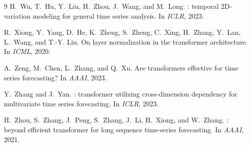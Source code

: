 \documentclass[11pt]{article}
\begin{document}
\begin{thebibliography}{9}
H.~Wu, T.~Hu, Y.~Liu, H.~Zhou, J.~Wang, and M.~Long.
: temporal 2{D}-variation modeling for general time
  series analysis.
\newblock In \emph{ICLR}, 2023.

R.~Xiong, Y.~Yang, D.~He, K.~Zheng, S.~Zheng, C.~Xing, H.~Zhang,
  Y.~Lan, L.~Wang, and T.-Y. Liu.
\newblock On layer normalization in the transformer architecture.
\newblock In \emph{ICML}, 2020.

A.~Zeng, M.~Chen, L.~Zhang, and Q.~Xu.
\newblock Are transformers effective for time series forecasting?
\newblock In \emph{AAAI}, 2023.

Y.~Zhang and J.~Yan.
: transformer utilizing cross-dimension dependency
  for multivariate time series forecasting.
\newblock In \emph{ICLR}, 2023.

H.~Zhou, S.~Zhang, J.~Peng, S.~Zhang, J.~Li, H.~Xiong, and W.~Zhang.
: beyond efficient transformer for long sequence
  time-series forecasting.
\newblock In \emph{AAAI}, 2021.
\end{thebibliography}
\end{document}

